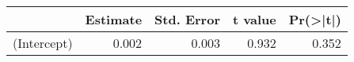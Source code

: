 
\begin{tabular}{l|r|r|r|r}
\hline
  & Estimate & Std. Error & t value & Pr(>|t|)\\
\hline
(Intercept) & 0.002 & 0.003 & 0.932 & 0.352\\
\hline
\end{tabular}
